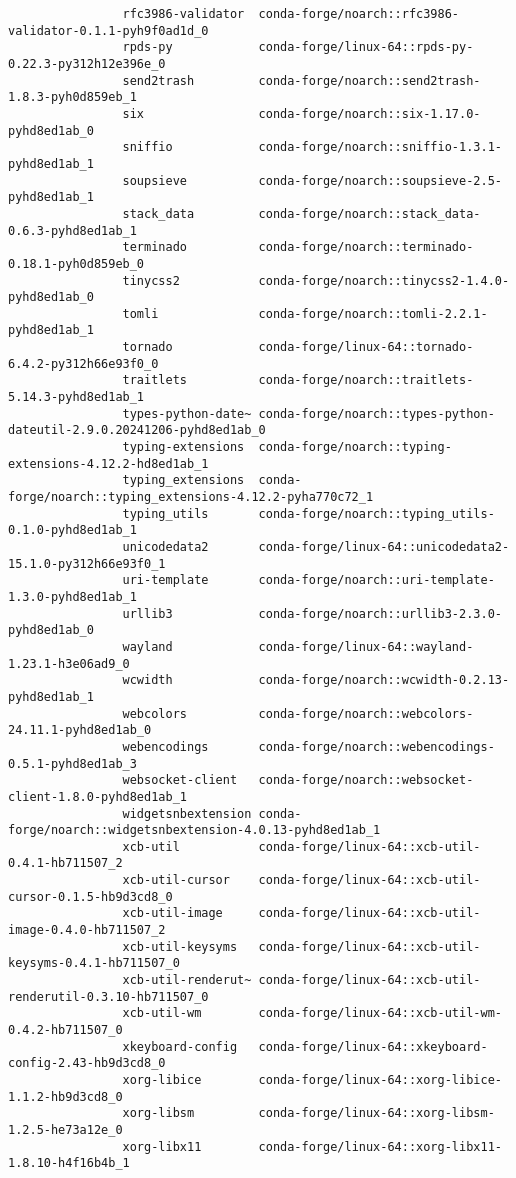 \documentclass{article}
\begin{document}
\begin{itemize}
\begin{itemize}
\begin{itemize}
\begin{verbatim}
				rfc3986-validator  conda-forge/noarch::rfc3986-validator-0.1.1-pyh9f0ad1d_0 
				rpds-py            conda-forge/linux-64::rpds-py-0.22.3-py312h12e396e_0 
				send2trash         conda-forge/noarch::send2trash-1.8.3-pyh0d859eb_1 
				six                conda-forge/noarch::six-1.17.0-pyhd8ed1ab_0 
				sniffio            conda-forge/noarch::sniffio-1.3.1-pyhd8ed1ab_1 
				soupsieve          conda-forge/noarch::soupsieve-2.5-pyhd8ed1ab_1 
				stack_data         conda-forge/noarch::stack_data-0.6.3-pyhd8ed1ab_1 
				terminado          conda-forge/noarch::terminado-0.18.1-pyh0d859eb_0 
				tinycss2           conda-forge/noarch::tinycss2-1.4.0-pyhd8ed1ab_0 
				tomli              conda-forge/noarch::tomli-2.2.1-pyhd8ed1ab_1 
				tornado            conda-forge/linux-64::tornado-6.4.2-py312h66e93f0_0 
				traitlets          conda-forge/noarch::traitlets-5.14.3-pyhd8ed1ab_1 
				types-python-date~ conda-forge/noarch::types-python-dateutil-2.9.0.20241206-pyhd8ed1ab_0 
				typing-extensions  conda-forge/noarch::typing-extensions-4.12.2-hd8ed1ab_1 
				typing_extensions  conda-forge/noarch::typing_extensions-4.12.2-pyha770c72_1 
				typing_utils       conda-forge/noarch::typing_utils-0.1.0-pyhd8ed1ab_1 
				unicodedata2       conda-forge/linux-64::unicodedata2-15.1.0-py312h66e93f0_1 
				uri-template       conda-forge/noarch::uri-template-1.3.0-pyhd8ed1ab_1 
				urllib3            conda-forge/noarch::urllib3-2.3.0-pyhd8ed1ab_0 
				wayland            conda-forge/linux-64::wayland-1.23.1-h3e06ad9_0 
				wcwidth            conda-forge/noarch::wcwidth-0.2.13-pyhd8ed1ab_1 
				webcolors          conda-forge/noarch::webcolors-24.11.1-pyhd8ed1ab_0 
				webencodings       conda-forge/noarch::webencodings-0.5.1-pyhd8ed1ab_3 
				websocket-client   conda-forge/noarch::websocket-client-1.8.0-pyhd8ed1ab_1 
				widgetsnbextension conda-forge/noarch::widgetsnbextension-4.0.13-pyhd8ed1ab_1 
				xcb-util           conda-forge/linux-64::xcb-util-0.4.1-hb711507_2 
				xcb-util-cursor    conda-forge/linux-64::xcb-util-cursor-0.1.5-hb9d3cd8_0 
				xcb-util-image     conda-forge/linux-64::xcb-util-image-0.4.0-hb711507_2 
				xcb-util-keysyms   conda-forge/linux-64::xcb-util-keysyms-0.4.1-hb711507_0 
				xcb-util-renderut~ conda-forge/linux-64::xcb-util-renderutil-0.3.10-hb711507_0 
				xcb-util-wm        conda-forge/linux-64::xcb-util-wm-0.4.2-hb711507_0 
				xkeyboard-config   conda-forge/linux-64::xkeyboard-config-2.43-hb9d3cd8_0 
				xorg-libice        conda-forge/linux-64::xorg-libice-1.1.2-hb9d3cd8_0 
				xorg-libsm         conda-forge/linux-64::xorg-libsm-1.2.5-he73a12e_0 
				xorg-libx11        conda-forge/linux-64::xorg-libx11-1.8.10-h4f16b4b_1 

\end{verbatim}
\end{itemize}
\end{itemize}
\end{itemize}
\end{document}
